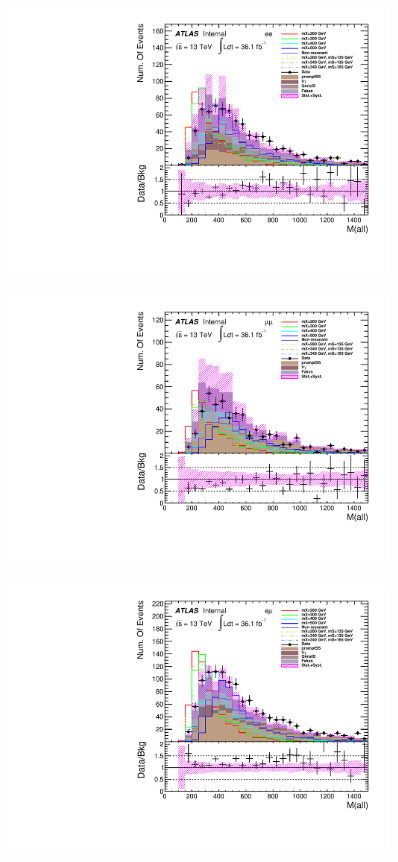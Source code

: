 \begin{figure}[h]
\begin{minipage}[t]{0.33\linewidth}
 \end{minipage}
 \begin{minipage}[t]{0.33\linewidth}
 \centering
 \includegraphics[width=0.9\textwidth,angle=-90]{fig/dataMC_low_Njet_CR/m_all_ee.pdf}\label{fig:dataMC_low_Njet_CR:m_all_ee.pdf}
 \end{minipage}
  \begin{minipage}[t]{0.33\linewidth}
 \centering
 \includegraphics[width=0.9\textwidth,angle=-90]{fig/dataMC_low_Njet_CR/m_all_mumu.pdf}\label{fig:dataMC_low_Njet_CR:m_all_mumu.pdf}
 \end{minipage}
 \begin{minipage}[t]{0.33\linewidth}
 \centering
 \includegraphics[width=0.9\textwidth,angle=-90]{fig/dataMC_low_Njet_CR/m_all_emu.pdf}\label{fig:dataMC_low_Njet_CR:m_all_emu.pdf}

\end{minipage}
\end{figure}
